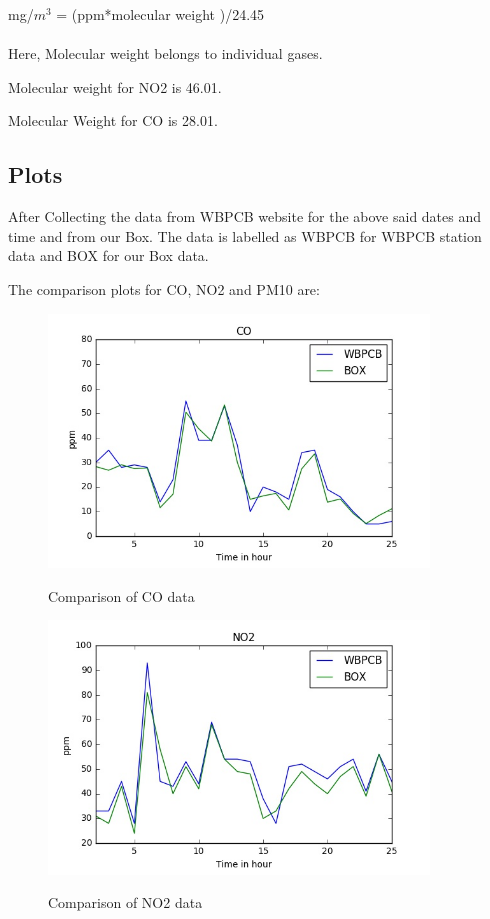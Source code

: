 mg/$m^3$ = (ppm*molecular weight )/24.45
\\
\\
Here, Molecular weight belongs to individual gases. 

Molecular weight for NO2 is 46.01.

Molecular Weight for CO is 28.01.

\subsection{Plots}
After Collecting the data from WBPCB website for the above said dates and time and from our Box.
The data is labelled as WBPCB for WBPCB station data and BOX for our Box data.

The comparison plots for CO, NO2 and PM10 are:


\begin{figure}[!htbp]
	\centering
	\includegraphics[width=0.9\textwidth]{co.jpg}
	\label{fig:Comparison of CO data}
	\caption{Comparison of CO data}
\end{figure}

\begin{figure}[!htbp]
	\centering
	\includegraphics[width=0.9\textwidth]{no2.jpg}
	\label{fig:Comparison of NO2 data}
	\caption{Comparison of NO2 data}
\end{figure}

